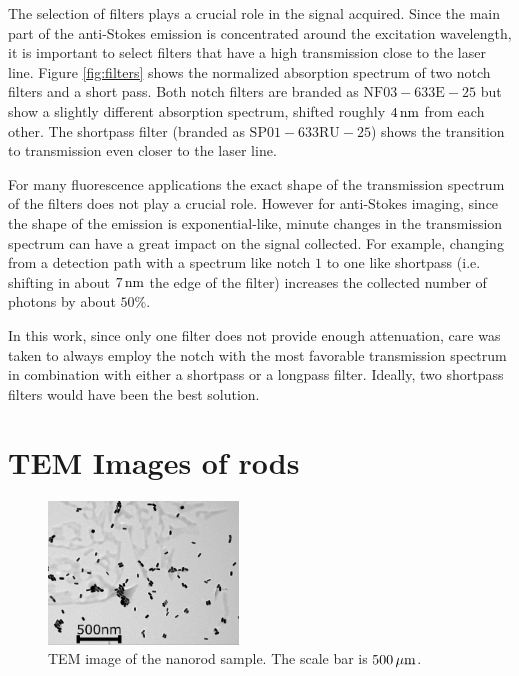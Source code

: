 The selection of filters plays a crucial role in the signal acquired. Since the
main part of the anti-Stokes emission is concentrated around the excitation
wavelength, it is important to select filters that have a high transmission
close to the laser line. Figure \ref{fig:filters} shows the normalized
absorption spectrum of two notch filters and a short pass. Both notch filters are
branded as $\textrm{NF}03-633\textrm{E}-25$ but show a slightly different
absorption spectrum, shifted roughly $4\,\textrm{nm}$ from each other. The shortpass
filter (branded as $\textrm{SP}01-633\textrm{RU}-25$) shows the transition to
transmission even closer to the laser line. 

For many fluorescence applications the exact shape of the transmission
spectrum of the filters does not play a crucial role. However for anti-Stokes
imaging, since the shape of the emission is exponential-like, minute
changes in the transmission spectrum can have a great impact on the signal collected. For example, changing from
a detection path with a spectrum like notch $1$ to one like shortpass (i.e.
shifting in about $7\,\textrm{nm}$ the edge of the filter) increases the collected number
of photons by about $50\%$. 

In this work, since only one filter does not provide enough attenuation, care was
taken to always employ the notch with the most favorable transmission spectrum
in combination with either a shortpass or a longpass filter. Ideally, two
shortpass filters would have been the best solution.

\newpage
 
\section{TEM Images of rods}
 
\begin{figure}[htp]
 \centering
 \includegraphics[width=0.45\textwidth]{Chapters/03_Background_Free/Figures/Supplementary/04_TEM/tem.png}
 \caption{TEM image of the nanorod sample. The scale bar is $500\,\mu\textrm{m}$. }
 \label{fig:TEM}
 \end{figure}
 
